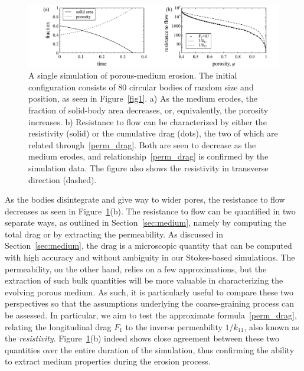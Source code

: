 \documentclass[3p]{elsarticle}
\begin{document}
\begin{figure}%
\centering
\includegraphics[width = 0.99 \textwidth]{./figs/fig2.pdf}
\caption{A single simulation of porous-medium erosion. The initial configuration consists of 80 circular bodies of random size and position, as seen in Figure~\ref{fig1}. a) As the medium erodes, the fraction of solid-body area decreases, or, equivalently, the porosity increases. b) Resistance to flow can be characterized by either the resistivity (solid) or the cumulative drag (dots), the two of which are related through~\eqref{perm_drag}. Both are seen to decrease as the medium erodes, and relationship~\eqref{perm_drag} is confirmed by the simulation data. The figure also shows the resistivity in transverse direction (dashed).
\label{fig2}
}
\end{figure}

As the bodies disintegrate and give way to wider pores, the resistance to flow decreases as seen in Figure~\ref{fig2}(b). The resistance to flow can be quantified in two separate ways, as outlined in Section~\ref{sec:medium}, namely by computing the total drag or by extracting the permeability. As discussed in Section~\ref{sec:medium}, the drag is a microscopic quantity that can be computed with high accuracy and without ambiguity in our Stokes-based simulations. The permeability, on the other hand, relies on a few approximations, but the extraction of such bulk quantities will be more valuable in characterizing the evolving porous medium. As such, it is particularly useful to compare these two perspectives so that the assumptions underlying the coarse-graining process can be assessed. In particular, we aim to test the approximate formula~\eqref{perm_drag}, relating the longitudinal drag $F_1$ to the inverse permeability $1/k_{11}$, also known as the {\em resistivity}. Figure~\ref{fig2}(b) indeed shows close agreement between these two quantities over the entire duration of the simulation, thus confirming the ability to extract medium properties during the erosion process.
\end{document}
